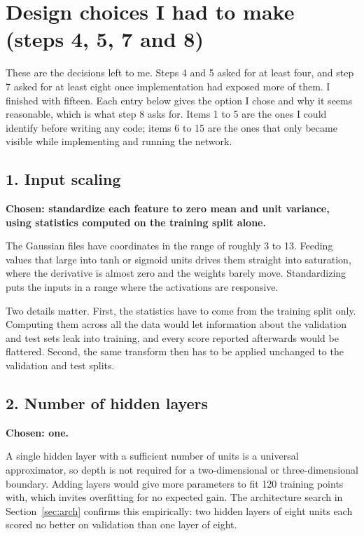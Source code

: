\documentclass[11pt]{article}
\begin{document}
\section{Design choices I had to make (steps 4, 5, 7 and 8)}
\label{sec:mine}

These are the decisions left to me. Steps 4 and 5 asked for at least four, and
step 7 asked for at least eight once implementation had exposed more of them. I
finished with fifteen. Each entry below gives the option I chose and why it
seems reasonable, which is what step 8 asks for. Items 1 to 5 are the ones I could identify before
writing any code; items 6 to 15 are the ones that only became visible while
implementing and running the network.

\subsection*{1. Input scaling}
\textbf{Chosen: standardize each feature to zero mean and unit variance, using
statistics computed on the training split alone.}

The Gaussian files have coordinates in the range of roughly 3 to 13. Feeding
values that large into tanh or sigmoid units drives them straight into
saturation, where the derivative is almost zero and the weights barely move.
Standardizing puts the inputs in a range where the activations are responsive.

Two details matter. First, the statistics have to come from the training split
only. Computing them across all the data would let information about the
validation and test sets leak into training, and every score reported
afterwards would be flattered. Second, the same transform then has to be applied
unchanged to the validation and test splits.

\subsection*{2. Number of hidden layers}
\textbf{Chosen: one.}

A single hidden layer with a sufficient number of units is a universal
approximator, so depth is not required for a two-dimensional or
three-dimensional boundary. Adding layers would give more parameters to fit 120
training points with, which invites overfitting for no expected gain. The
architecture search in Section~\ref{sec:arch} confirms this empirically: two
hidden layers of eight units each scored no better on validation than one layer
of eight.
\end{document}

